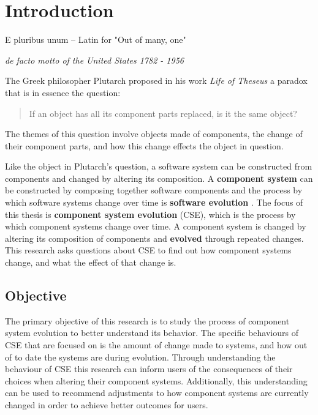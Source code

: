 \chapter{Introduction}
\label{introduction}
\epigraph{E pluribus unum -- Latin for "Out of many, one"}
{\textit{de facto motto of the United States 1782 - 1956}}
The Greek philosopher Plutarch proposed in his work \textit{Life of Theseus} a paradox that is in essence the question:
\begin{quote}
If an object has all its component parts replaced, is it the same object?
\end{quote}
The themes of this question involve objects made of components, the change of their component parts,
and how this change effects the object in question.

Like the object in Plutarch's question, a software system can be constructed from components and changed by altering its composition.
A \textbf{component system} can be constructed by composing together software components \citep{Szyperski2002}
and the process by which software systems change over time is \textbf{software evolution} \citep{lehman1980}.
The focus of this thesis is \textbf{component system evolution} (CSE), which is the process by which component systems change over time.
A component system is changed by altering its composition of components and \textbf{evolved} through repeated changes.
This research asks questions about CSE to find out how component systems change, and what the effect of that change is.

\section{Objective}
The primary objective of this research is to study the process of component system evolution to better understand its behavior.
The specific behaviours of CSE that are focused on is the amount of change made to systems, and how out of to date the systems are during evolution.
Through understanding the behaviour of CSE this research can inform users of the consequences of their choices when altering their component systems.
Additionally, this understanding can be used to recommend adjustments to how component systems are currently changed in order to achieve better outcomes for users. 

